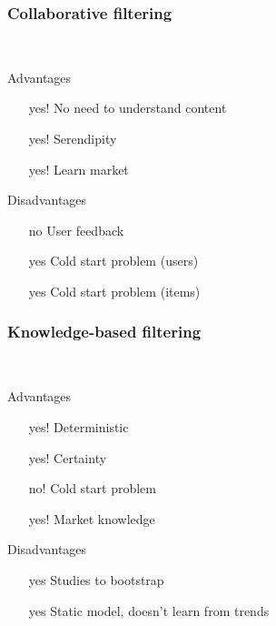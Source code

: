 \begin{frame}[t]
  \frametitle{Collaborative filtering}
  \textit{}\\
  \textit{}

  Advantages
  \begin{itemize}
  \item [yes!] No need to understand content
  \item [yes!] Serendipity
  \item [yes!] Learn market
  \end{itemize}

  \bigskip
  Disadvantages
  \begin{itemize}
  \item [no] User feedback
  \item [yes] Cold start problem (users)
  \item [yes] Cold start problem (items)
  \end{itemize}
\end{frame}

\begin{frame}[t]
  \frametitle{Knowledge-based filtering}
  \textit{}\\
  \textit{}

  Advantages
  \begin{itemize}
  \item [yes!] Deterministic
  \item [yes!] Certainty
  \item [no!] Cold start problem
  \item [yes!] Market knowledge
  \end{itemize}

  \bigskip
  Disadvantages
  \begin{itemize}
  \item [yes] Studies to bootstrap
  \item [yes] Static model, doesn't learn from trends
  \end{itemize}
\end{frame}



